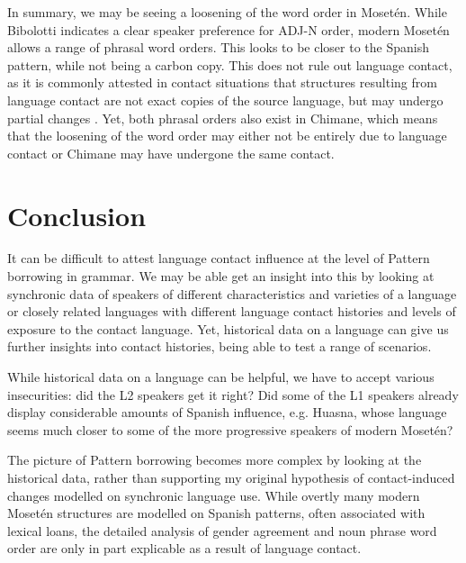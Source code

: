 \documentclass[output=paper,colorlinks,citecolor=brown
]{langscibook}
\begin{document}
In summary, we may be seeing a loosening of the word order in Mosetén. While Bibolotti indicates a clear speaker preference for ADJ-N order, modern Mosetén allows a range of phrasal word orders. This looks to be closer to the Spanish pattern, while not being a carbon copy. This does not rule out language contact, as it is commonly attested in contact situations that structures resulting from language contact are not exact copies of the source language, but may undergo partial changes \citep{heine2005language}. Yet, both phrasal orders also exist in Chimane, which means that the loosening of the word order may either not be entirely due to language contact or Chimane may have undergone the same contact.


\section{Conclusion}
It can be difficult to attest language contact influence at the level of Pattern borrowing in grammar. We may be able get an insight into this by looking at synchronic data of speakers of different characteristics and varieties of a language or closely related languages with different language contact histories and levels of exposure to the contact language. Yet, historical data on a language can give us further insights into contact histories, being able to test a range of scenarios.

While historical data on a language can be helpful, we have to accept various insecurities: did the L2 speakers get it right? Did some of the L1 speakers already display considerable amounts of Spanish influence, e.g. Huasna, whose language seems much closer to some of the more progressive speakers of modern Mosetén?

The picture of Pattern borrowing becomes more complex by looking at the historical data, rather than supporting my original hypothesis of contact-induced changes modelled on synchronic language use. While overtly many modern Mosetén structures are modelled on Spanish patterns, often associated with lexical loans, the detailed analysis of gender agreement and noun phrase word order are only in part explicable as a result of language contact. 
\end{document}
